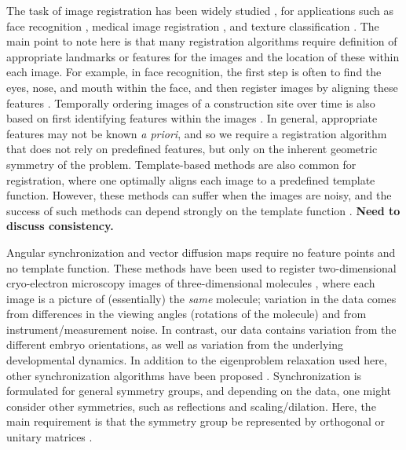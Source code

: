 \documentclass{pnastwo}
\begin{document}
\begin{article}
The task of image registration has been widely studied \cite{zitova2003image}, for applications such as face recognition \cite{rowley1998rotation}, medical image registration \cite{hajnal2010medical}, and texture classification \cite{greenspan1994rotation}.
%
The main point to note here is that many registration algorithms require definition of appropriate landmarks or features for the images and the location of these within each image.
%
For example, in face recognition, the first step is often to find the eyes, nose, and mouth within the face, and then register images by aligning these features \cite{zhao2003face}.
%
Temporally ordering images of a construction site over time is also based on first identifying features within the images \cite{schindler2007inferring}.
%
In general, appropriate features may not be known {\it a priori}, and so we require a registration algorithm that does not rely on predefined features, but only on the inherent geometric symmetry of the problem.
%
Template-based methods are also common for registration, where one optimally aligns each image to a predefined template function.
%
However, these methods can suffer when the images are noisy, and the success of such methods can depend strongly on the template function \cite{shatsky2009method}.
%
{\bf Need to discuss consistency.}

Angular synchronization and vector diffusion maps require no feature points and no template function.
%
These methods have been used to register two-dimensional cryo-electron microscopy images of three-dimensional molecules \cite{singer2011three}, where each image is a picture of (essentially) the {\it same} molecule; variation in the data comes from differences in the viewing angles (rotations of the molecule) and from instrument/measurement noise.
%
In contrast, our data contains variation from the different embryo orientations, as well as variation from the underlying developmental dynamics. %
%
In addition to the eigenproblem relaxation used here, other synchronization algorithms have been proposed \cite{bandeira2014multireference}.
%
Synchronization is formulated for general symmetry groups, and depending on the data, one might consider other symmetries, such as reflections and scaling/dilation.
%
Here, the main requirement is that the symmetry group be represented by orthogonal or unitary matrices \cite{singer2013spectral}.


\end{article}
\end{document}
